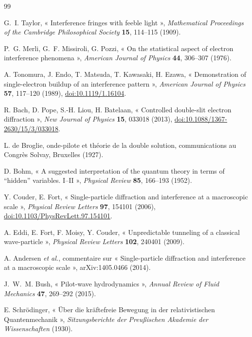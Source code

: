 \begingroup
\setlength{\parskip}{0pt}
\begin{thebibliography}{99}\small
\setlength{\itemsep}{0.15em}

G.~I. Taylor,
« Interference fringes with feeble light »,
\emph{Mathematical Proceedings of the Cambridge Philosophical Society} \textbf{15},
114--115 (1909).

P.~G. Merli, G.~F. Missiroli, G. Pozzi,
« On the statistical aspect of electron interference phenomena »,
\emph{American Journal of Physics} \textbf{44}, 306--307 (1976).

A. Tonomura, J. Endo, T. Matsuda, T. Kawasaki, H. Ezawa,
« Demonstration of single-electron buildup of an interference pattern »,
\emph{American Journal of Physics} \textbf{57}, 117--120 (1989),
\href{https://doi.org/10.1119/1.16104}{doi:10.1119/1.16104}.

R. Bach, D. Pope, S.-H. Liou, H. Batelaan,
« Controlled double-slit electron diffraction »,
\emph{New Journal of Physics} \textbf{15}, 033018 (2013),
\href{https://doi.org/10.1088/1367-2630/15/3/033018}{doi:10.1088/1367-2630/15/3/033018}.

L. de Broglie,
onde-pilote et théorie de la double solution,
communications au Congrès Solvay, Bruxelles (1927).

D. Bohm,
« A suggested interpretation of the quantum theory in terms of ``hidden''
variables. I--II »,
\emph{Physical Review} \textbf{85}, 166--193 (1952).

Y. Couder, E. Fort,
« Single-particle diffraction and interference at a macroscopic scale »,
\emph{Physical Review Letters} \textbf{97}, 154101 (2006),
\href{https://doi.org/10.1103/PhysRevLett.97.154101}{doi:10.1103/PhysRevLett.97.154101}.

A. Eddi, E. Fort, F. Moisy, Y. Couder,
« Unpredictable tunneling of a classical wave-particle »,
\emph{Physical Review Letters} \textbf{102}, 240401 (2009).

A. Andersen \emph{et al.},
commentaire sur « Single-particle diffraction and interference at a macroscopic
scale », arXiv:1405.0466 (2014).

J.~W.~M. Bush,
« Pilot-wave hydrodynamics »,
\emph{Annual Review of Fluid Mechanics} \textbf{47}, 269--292 (2015).

E. Schrödinger,
« Über die kräftefreie Bewegung in der relativistischen Quantenmechanik »,
\emph{Sitzungsberichte der Preußischen Akademie der Wissenschaften} (1930).


\end{thebibliography}
